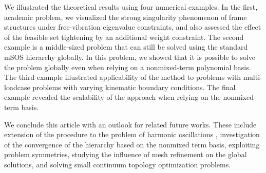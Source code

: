 \documentclass[final,onefignum,onetabnum]{siamart220329}
\begin{document}
We illustrated the theoretical results using {four} numerical examples. In the first, academic problem, we visualized the strong singularity phenomenon of frame structures under free-vibration eigenvalue constraints, and also assessed the effect of the feasible set tightening by an additional weight constraint. The second example is a middle-sized problem that can still be solved using the standard mSOS hierarchy globally. In this problem, we showed that it is possible to solve the problem globally even when relying on a nonmixed-term polynomial basis. {The third example illustrated applicability of the method to problems with multi-loadcase problems with varying kinematic boundary conditions.} The final example revealed the scalability of the approach when relying on the nonmixed-term basis.

We conclude this article with an outlook for related future works. These include extension of the procedure to the problem of harmonic oscillations \cite{ma2024truss}, investigation of the convergence of the hierarchy based on the nonmixed term basis, {exploiting problem symmetries, studying the influence of mesh refinement on the global solutions}, and solving small continuum topology optimization problems.

\end{document}
